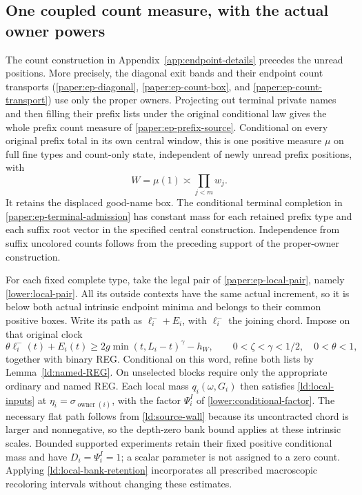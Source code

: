 \subsection{One coupled count measure, with the actual owner powers}

The count construction in Appendix~\ref{app:endpoint-details} precedes
the unread positions.  More precisely, the diagonal exit bands and
their endpoint count transports (\ref{paper:ep-diagonal},
\ref{paper:ep-count-box}, and \ref{paper:ep-count-transport}) use
only the proper owners.  Projecting out terminal private names and
then filling their prefix lists under the original conditional law
gives the whole prefix count measure of
\ref{paper:ep-prefix-source}.  Conditional on every original prefix
total in its own central window, this is one positive measure \(\mu\)
on full fine types and count-only state, independent of newly unread
prefix positions, with
\begin{equation}
 W=\mu(1)\asymp\prod_{j<m}w_j.
 \label{ld:whole-count-mass}
\end{equation}
It retains the displaced good-name box.  The conditional terminal
completion in \ref{paper:ep-terminal-admission} has constant mass
for each retained prefix type and each suffix root vector in the
specified central construction.  Independence from suffix uncolored
counts follows from the preceding support of the proper-owner
construction.

For each fixed complete type, take the legal pair of
\ref{paper:ep-local-pair}, namely \eqref{lower:local-pair}.  All its
outside contexts have the same actual increment, so it is below
both actual intrinsic endpoint minima and belongs to their common
positive boxes.  Write its path as \(\ell_i^-+E_i\), with
\(\ell_i^-\) the joining chord.  Impose on that original clock
\begin{equation}
 \theta\ell_i^-(t)+E_i(t)\ge
         2g\min(t,L_i-t)^\gamma-h_W,
       \qquad 0<\zeta<\gamma<1/2,\quad0<\theta<1,
 \label{ld:source-wall}
\end{equation}
together with binary REG.  Conditional on this word, refine both
lists by Lemma~\ref{ld:named-REG}.  On unselected blocks require
only the appropriate ordinary and named REG.  Each local mass
\(q_i(\omega,G_i)\) then satisfies \eqref{ld:local-inputs} at
\(\eta_i=\sigma_{\operatorname{owner}(i)}\), with the factor
\(\Psi_i^I\) of \eqref{lower:conditional-factor}.
The necessary flat path follows from \eqref{ld:source-wall} because
its uncontracted chord is larger and nonnegative, so the depth-zero
bank bound applies at these intrinsic scales.  Bounded supported
experiments retain their fixed positive conditional mass and have
\(D_i=\Psi_i^I=1\); a scalar parameter is not assigned to a zero
count.  Applying \eqref{ld:local-bank-retention} incorporates all
prescribed macroscopic recoloring intervals without changing these
estimates.

